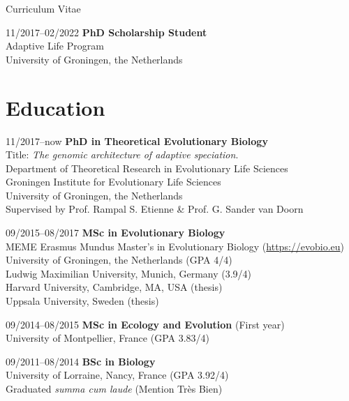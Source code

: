 \documentclass[11pt,a4paper]{article}
\begin{document}
\begin{cv}{Curriculum Vitae}
\begin{cvlist}{}
            \item[11/2017--02/2022]
            \textbf{PhD Scholarship Student}\\
            Adaptive Life Program\\
            University of Groningen, the Netherlands

        \end{cvlist}
		
		\section{Education}
		
		\begin{cvlist}{}
			
			\item[11/2017--now] 
			\textbf{PhD in Theoretical Evolutionary Biology}\\
            Title: 
			\textit{The genomic architecture of adaptive speciation}.\\
			Department of Theoretical Research in Evolutionary Life Sciences\\
			Groningen Institute for Evolutionary Life Sciences\\
			University of Groningen, the Netherlands\\
			Supervised by Prof. Rampal S. Etienne \& Prof. G. Sander van Doorn
			
			\item[09/2015--08/2017] 
			\textbf{MSc in Evolutionary Biology}\\
			MEME Erasmus Mundus Master's in Evolutionary Biology (\url{https://evobio.eu})\\
			University of Groningen, the Netherlands (GPA 4/4)\\
			Ludwig Maximilian University, Munich, Germany (3.9/4)\\
			Harvard University, Cambridge, MA, USA (thesis)\\
			Uppsala University, Sweden (thesis)
			
			\item[09/2014--08/2015] 
			\textbf{MSc in Ecology and Evolution} (First year)\\
			University of Montpellier, France (GPA 3.83/4)
			
			\item[09/2011--08/2014] 
			\textbf{BSc in Biology}\\
			University of Lorraine, Nancy, France (GPA 3.92/4)\\
			Graduated \textit{summa cum laude} (Mention Tr\`{e}s Bien)
			 

\end{cvlist}
\end{cv}
\end{document}
